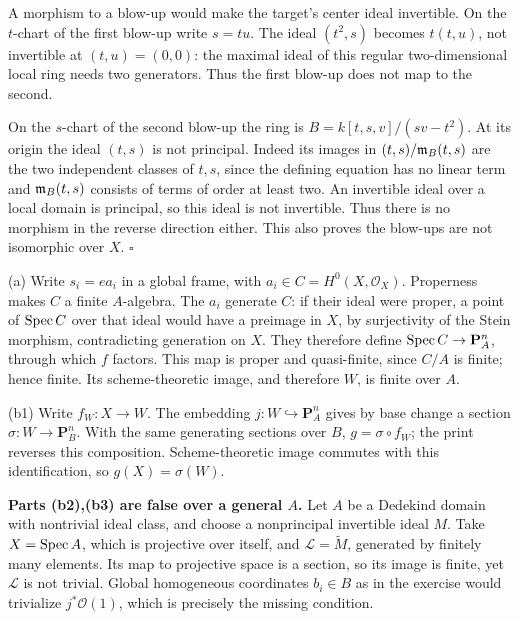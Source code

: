 \documentclass[11pt]{article}
\let\chapterexercise\exercise
\renewcommand{\exercise}[2]{\Needspace{8\baselineskip}\chapterexercise{#1}{#2}}
\begin{document}
\pf
A morphism to a blow-up would make the target's center ideal invertible. On the $t$-chart of the first blow-up write $s=tu$. The ideal $(t^2,s)$ becomes $t(t,u)$, not invertible at $(t,u)=(0,0)$: the maximal ideal of this regular two-dimensional local ring needs two generators. Thus the first blow-up does not map to the second.

On the $s$-chart of the second blow-up the ring is $B=k[t,s,v]/(sv-t^2)$. At its origin the ideal $(t,s)$ is not principal. Indeed its images in $(t,s)/\mathfrak m_B(t,s)$ are the two independent classes of $t,s$, since the defining equation has no linear term and $\mathfrak m_B(t,s)$ consists of terms of order at least two. An invertible ideal over a local domain is principal, so this ideal is not invertible. Thus there is no morphism in the reverse direction either. This also proves the blow-ups are not isomorphic over $X$. \hfill$\square$

\pf
(a) Write $s_i=e a_i$ in a global frame, with $a_i\in C=H^0(X,\mathcal O_X)$. Properness makes $C$ a finite $A$-algebra. The $a_i$ generate $C$: if their ideal were proper, a point of $\operatorname{Spec} C$ over that ideal would have a preimage in $X$, by surjectivity of the Stein morphism, contradicting generation on $X$. They therefore define $\operatorname{Spec} C\to\mathbf P^n_A$, through which $f$ factors. This map is proper and quasi-finite, since $C/A$ is finite; hence finite. Its scheme-theoretic image, and therefore $W$, is finite over $A$.

(b1) Write $f_W:X\to W$. The embedding $j:W\hookrightarrow\mathbf P^n_A$ gives by base change a section $\sigma:W\to\mathbf P^n_B$. With the same generating sections over $B$, $g=\sigma\circ f_W$; the print reverses this composition. Scheme-theoretic image commutes with this identification, so $g(X)=\sigma(W)$.

\textbf{Parts (b2),(b3) are false over a general $A$.} Let $A$ be a Dedekind domain with nontrivial ideal class, and choose a nonprincipal invertible ideal $M$. Take $X=\operatorname{Spec} A$, which is projective over itself, and $\mathcal L=\widetilde M$, generated by finitely many elements. Its map to projective space is a section, so its image is finite, yet $\mathcal L$ is not trivial. Global homogeneous coordinates $b_i\in B$ as in the exercise would trivialize $j^*\mathcal O(1)$, which is precisely the missing condition.
\end{document}
